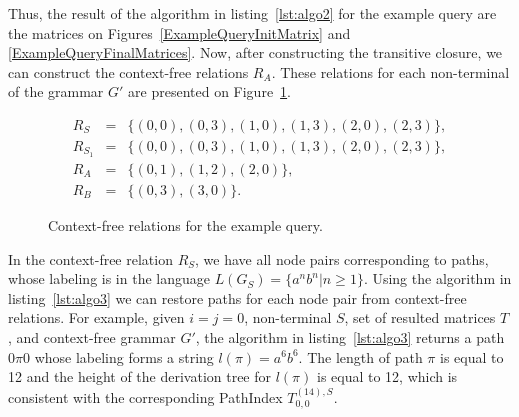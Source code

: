 Thus, the result of the algorithm in listing~\ref{lst:algo2} for the example query are the matrices on Figures~\ref{ExampleQueryInitMatrix} and \ref{ExampleQueryFinalMatrices}. Now, after constructing the transitive closure, we can construct the context-free relations $R_A$. These relations for each non-terminal of the grammar $G'$ are presented on Figure~\ref{ExampleQueryCFRelations}.

\begin{figure}[h]
	\begin{eqnarray*}
		R_S&=&\{(0,0),(0,3),(1,0),(1,3),(2,0),(2,3)\},\\
		R_{S_1}&=&\{(0,0),(0,3),(1,0),(1,3),(2,0),(2,3)\},\\
		R_{A}&=&\{(0,1),(1,2),(2,0)\}, \\
		R_{B}&=&\{(0,3), (3,0)\}.
	\end{eqnarray*}
	\caption{Context-free relations for the example query.}
	\label{ExampleQueryCFRelations}
\end{figure}

In the context-free relation $R_S$, we have all node pairs corresponding to paths, whose labeling is in the language $L(G_S) = \{a^n b^n| n \geq 1\}$. Using the algorithm in listing~\ref{lst:algo3} we can restore paths for each node pair from context-free relations. For example, given $i=j=0$, non-terminal $S$, set of resulted matrices $T$, and context-free grammar $G'$, the algorithm in listing~\ref{lst:algo3} returns a path $0\pi 0$ whose labeling forms a string $l(\pi) = a^6 b^6$. The length of path $\pi$ is equal to 12 and the height of the derivation tree for $l(\pi)$ is equal to 12, which is consistent with the corresponding PathIndex $T^{(14),S}_{0,0}$.